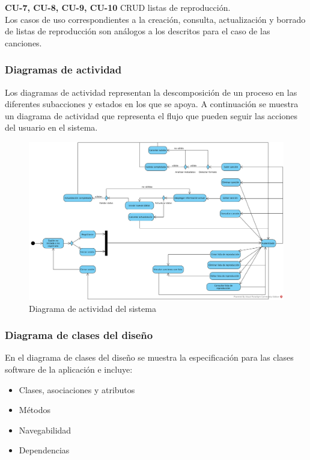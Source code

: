 
\textbf{CU-7, CU-8, CU-9, CU-10} CRUD listas de reproducción.\\

Los casos de uso correspondientes a la creación, consulta, actualización y borrado de listas de reproducción son análogos a los descritos para el caso de las canciones.

\subsubsection{Diagramas de actividad}

Los diagramas de actividad representan la descomposición de un proceso en las diferentes subacciones y estados en los que se apoya. A continuación se muestra un diagrama de actividad que representa el flujo que pueden seguir las acciones del usuario en el sistema.

\begin{figure}[H]
  \begin{center}
  \includegraphics[width=1\textwidth]{../visual_paradigm_uml/Diagrama_actividad_sistema.png}
  \caption{Diagrama de actividad del sistema}
  \label{fig:diag_ac_sis}
  \end{center}
\end{figure}

\subsubsection{Diagrama de clases del diseño}

En el diagrama de clases del diseño se muestra la especificación para las clases software de la aplicación e incluye:

\begin{itemize}
    \item Clases, asociaciones y atributos
    \item Métodos
    \item Navegabilidad
    \item Dependencias
\end{itemize}

